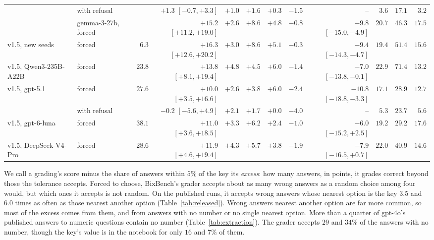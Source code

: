 \documentclass{article}
\begin{document}
\begin{table}[t]
{\begin{tabular}{llrrrrrrrrrr}
 & with refusal &  & $+1.3$ {\scriptsize$[-0.7,+3.3]$} & $+1.0$ & $+1.6$ & $+0.3$ & $-1.5$ & -- & $3.6$ & $17.1$ & $3.2$\\
 & gemma-3-27b, forced &  & $+15.2$ {\scriptsize$[+11.2,+19.0]$} & $+2.6$ & $+8.6$ & $+4.8$ & $-0.8$ & $-9.8$ {\scriptsize$[-15.0,-4.9]$} & $20.7$ & $46.3$ & $17.5$\\
v1.5, new seeds & forced & $6.3$ & $+16.3$ {\scriptsize$[+12.6,+20.2]$} & $+3.0$ & $+8.6$ & $+5.1$ & $-0.3$ & $-9.4$ {\scriptsize$[-14.3,-4.7]$} & $19.4$ & $51.4$ & $15.6$\\
v1.5, Qwen3-235B-A22B & forced & $23.8$ & $+13.8$ {\scriptsize$[+8.1,+19.4]$} & $+4.8$ & $+4.5$ & $+6.0$ & $-1.4$ & $-7.0$ {\scriptsize$[-13.8,-0.1]$} & $22.9$ & $71.4$ & $13.2$\\
v1.5, gpt-5.1 & forced & $27.6$ & $+10.0$ {\scriptsize$[+3.5,+16.6]$} & $+2.6$ & $+3.8$ & $+6.0$ & $-2.4$ & $-10.8$ {\scriptsize$[-18.8,-3.3]$} & $17.1$ & $28.9$ & $12.7$\\
 & with refusal &  & $-0.2$ {\scriptsize$[-5.6,+4.9]$} & $+2.1$ & $+1.7$ & $+0.0$ & $-4.0$ & -- & $5.3$ & $23.7$ & $5.6$\\
v1.5, gpt-6-luna & forced & $38.1$ & $+11.0$ {\scriptsize$[+3.6,+18.5]$} & $+3.3$ & $+6.2$ & $+2.4$ & $-1.0$ & $-6.0$ {\scriptsize$[-15.2,+2.5]$} & $19.2$ & $29.2$ & $17.6$\\
v1.5, DeepSeek-V4-Pro & forced & $28.6$ & $+11.9$ {\scriptsize$[+4.6,+19.4]$} & $+4.3$ & $+5.7$ & $+3.8$ & $-1.9$ & $-7.9$ {\scriptsize$[-16.5,+0.7]$} & $22.0$ & $40.9$ & $14.6$\\
\bottomrule
\end{tabular}}
\end{table}

We call a grading's score minus the share of answers within $5\%$ of the key its \emph{excess}: how many answers, in
points, it grades correct beyond those the tolerance accepts. Forced to choose, BixBench's grader accepts about as
many wrong answers as a random choice among four would, but which ones it accepts is not random. On the published
runs, it accepts wrong answers whose nearest option is the key $3.5$ and $6.0$ times as often as those nearest another
option (Table~\ref{tab:released}). Wrong answers nearest another option are far more common, so most of the excess
comes from them, and from answers with no number or no single nearest option. More than a quarter of gpt-4o's
published answers to numeric questions contain no number (Table~\ref{tab:extraction}). The grader accepts $29$ and
$34\%$ of the answers with no number, though the key's value is in the notebook for only $16$ and $7\%$ of them.
\end{document}
